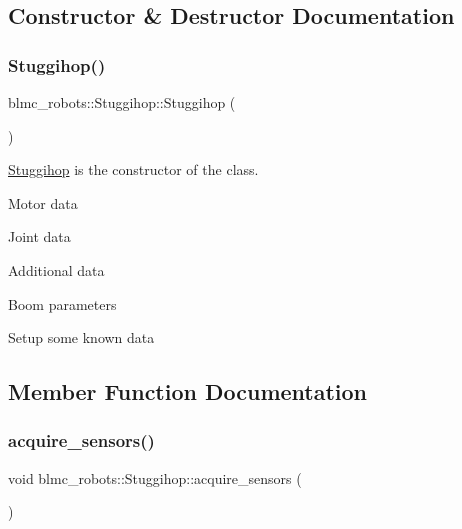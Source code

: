 \subsection{Constructor \& Destructor Documentation}
\mbox{\label{classblmc__robots_1_1Stuggihop_aea7781a2eb5a410ca8ab2bbfe425cb6a}} 
\subsubsection{\texorpdfstring{Stuggihop()}{Stuggihop()}}
{\footnotesize\ttfamily blmc\+\_\+robots\+::\+Stuggihop\+::\+Stuggihop (\begin{DoxyParamCaption}{ }\end{DoxyParamCaption})}



\hyperlink{classblmc__robots_1_1Stuggihop}{Stuggihop} is the constructor of the class. 

Motor data

Joint data

Additional data

Boom parameters

Setup some known data

\subsection{Member Function Documentation}
\mbox{\label{classblmc__robots_1_1Stuggihop_a594cb654f63c3ff8fb7718ce7d393d81}} 
\subsubsection{\texorpdfstring{acquire\+\_\+sensors()}{acquire\_sensors()}}
{\footnotesize\ttfamily void blmc\+\_\+robots\+::\+Stuggihop\+::acquire\+\_\+sensors (\begin{DoxyParamCaption}{ }\end{DoxyParamCaption})}



